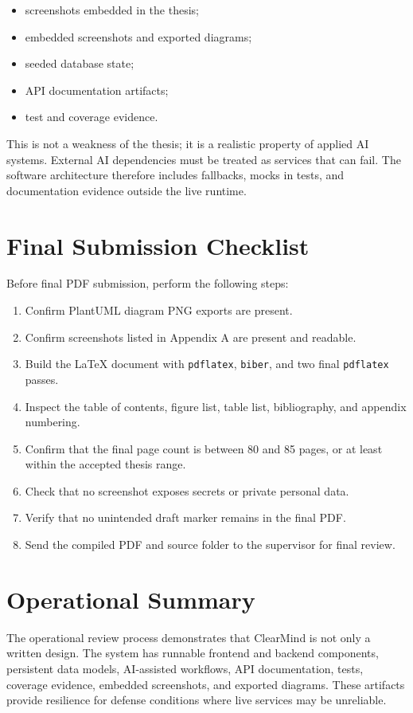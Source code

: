 \begin{itemize}
  \item screenshots embedded in the thesis;
  \item embedded screenshots and exported diagrams;
  \item seeded database state;
  \item API documentation artifacts;
  \item test and coverage evidence.
\end{itemize}

This is not a weakness of the thesis; it is a realistic property of applied AI systems. External AI dependencies must be treated as services that can fail. The software architecture therefore includes fallbacks, mocks in tests, and documentation evidence outside the live runtime.

\section{Final Submission Checklist}

Before final PDF submission, perform the following steps:

\begin{enumerate}
  \item Confirm PlantUML diagram PNG exports are present.
  \item Confirm screenshots listed in Appendix A are present and readable.
  \item Build the LaTeX document with \texttt{pdflatex}, \texttt{biber}, and two final \texttt{pdflatex} passes.
  \item Inspect the table of contents, figure list, table list, bibliography, and appendix numbering.
  \item Confirm that the final page count is between 80 and 85 pages, or at least within the accepted thesis range.
  \item Check that no screenshot exposes secrets or private personal data.
  \item Verify that no unintended draft marker remains in the final PDF.
  \item Send the compiled PDF and source folder to the supervisor for final review.
\end{enumerate}

\section{Operational Summary}

The operational review process demonstrates that ClearMind is not only a written design. The system has runnable frontend and backend components, persistent data models, AI-assisted workflows, API documentation, tests, coverage evidence, embedded screenshots, and exported diagrams. These artifacts provide resilience for defense conditions where live services may be unreliable.
